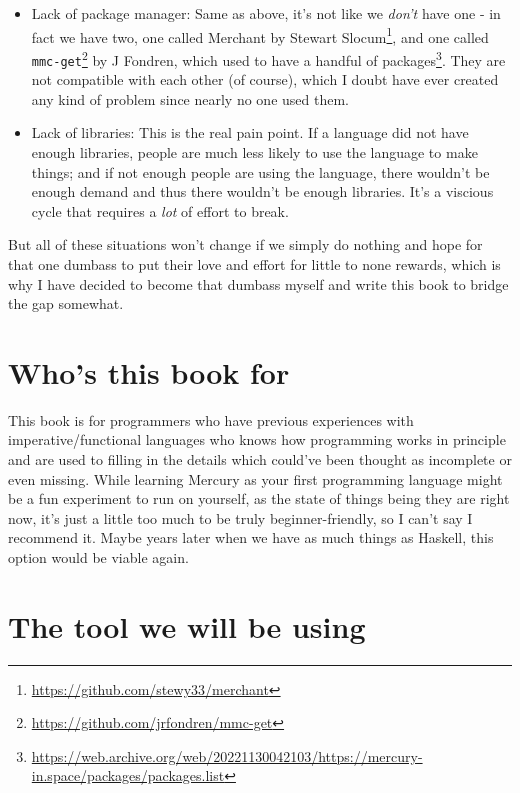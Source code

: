 \begin{itemize}
\begin{itemize}
    \end{itemize}
\item Lack of package manager: Same as above, it's not like we \textit{don't} have one - in fact we have two, one called Merchant by Stewart Slocum\footnote{\url{https://github.com/stewy33/merchant}}, and one called \texttt{mmc-get}\footnote{\url{https://github.com/jrfondren/mmc-get}} by J Fondren, which used to have a handful of packages\footnote{\url{https://web.archive.org/web/20221130042103/https://mercury-in.space/packages/packages.list}}. They are not compatible with each other (of course), which I doubt have ever created any kind of problem since nearly no one used them. 
\item Lack of libraries: This is the real pain point. If a language did not have enough libraries, people are much less likely to use the language to make things; and if not enough people are using the language, there wouldn't be enough demand and thus there wouldn't be enough libraries. It's a viscious cycle that requires a \textit{lot} of effort to break.
  
\end{itemize}

But all of these situations won't change if we simply do nothing and hope for that one dumbass to put their love and effort for little to none rewards, which is why I have decided to become that dumbass myself and write this book to bridge the gap somewhat.

\section{Who's this book for}

This book is for programmers who have previous experiences with imperative/functional languages who knows how programming works in principle and are used to filling in the details which could've been thought as incomplete or even missing. While learning Mercury as your first programming language might be a fun experiment to run on yourself, as the state of things being they are right now, it's just a little too much to be truly beginner-friendly, so I can't say I recommend it. Maybe years later when we have as much things as Haskell, this option would be viable again.

\section{The tool we will be using}

